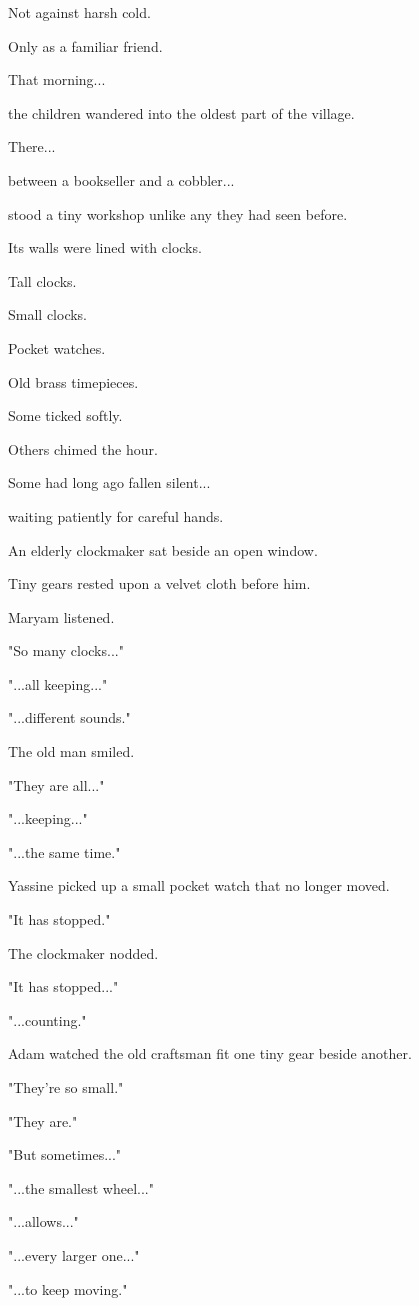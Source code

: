 \documentclass[12pt,openany]{book}
\begin{document}
Not against harsh cold.

Only as a familiar friend.

That morning...

the children wandered into the oldest part of the village.

There...

between a bookseller and a cobbler...

stood a tiny workshop unlike any they had seen before.

Its walls were lined with clocks.

Tall clocks.

Small clocks.

Pocket watches.

Old brass timepieces.

Some ticked softly.

Others chimed the hour.

Some had long ago fallen silent...

waiting patiently for careful hands.

An elderly clockmaker sat beside an open window.

Tiny gears rested upon a velvet cloth before him.

Maryam listened.

"So many clocks..."

"...all keeping..."

"...different sounds."

The old man smiled.

"They are all..."

"...keeping..."

"...the same time."

Yassine picked up a small pocket watch that no longer moved.

"It has stopped."

The clockmaker nodded.

"It has stopped..."

"...counting."

Adam watched the old craftsman fit one tiny gear beside another.

"They're so small."

"They are."

"But sometimes..."

"...the smallest wheel..."

"...allows..."

"...every larger one..."

"...to keep moving."
\end{document}
